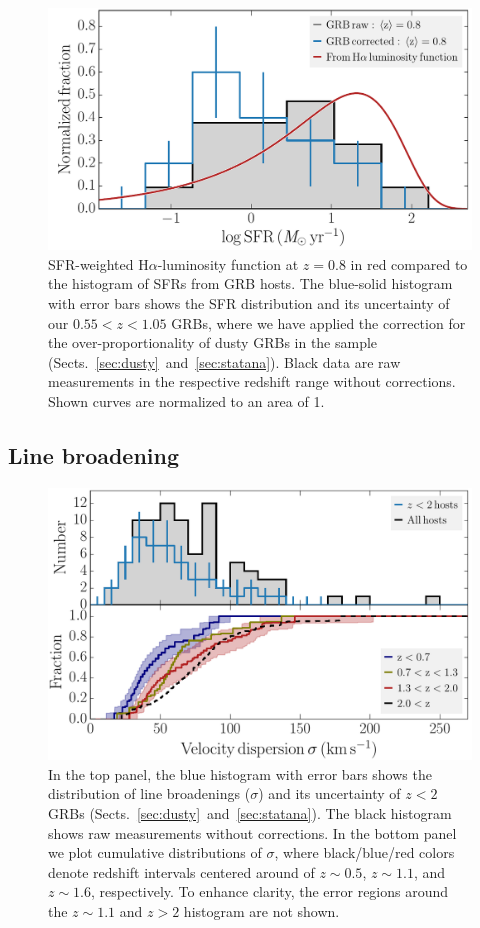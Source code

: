 \documentclass[traditabstract, longauth]{aa}
\newcommand{\ha}{H$\alpha$}
\begin{document}
\begin{figure}
\includegraphics[angle=0, width=0.99\columnwidth]{Figs/SFRvsLFHa.pdf}
\caption{ {SFR-weighted \ha-luminosity function at $z=0.8$ \citep{2011ApJ...726..109L} in red compared to the histogram of SFRs from GRB hosts. The blue-solid histogram with error bars shows the SFR distribution and its uncertainty of our $0.55 < z < 1.05$ GRBs, where we have applied the correction for the over-proportionality of dusty GRBs in the sample (Sects.~\ref{sec:dusty}~and~\ref{sec:statana}). Black data are raw measurements in the respective redshift range without corrections. Shown curves are normalized to an area of 1.}}
\label{fig:sfrhalpha}
\end{figure}

\subsection{Line broadening}
\label{sec:velo}

\begin{figure}
\includegraphics[angle=0, width=0.99\columnwidth]{Figs/Velo_histogram.pdf}
\caption{In the top panel, the blue histogram with error bars shows the distribution of line broadenings ($\sigma$) and its uncertainty of $z < 2$ GRBs (Sects.~\ref{sec:dusty}~and~\ref{sec:statana}). The black histogram shows raw measurements without corrections. In the bottom panel we plot cumulative distributions of $\sigma$, where black/blue/red colors denote redshift intervals centered around of $z\sim0.5$, $z\sim1.1$, and $z\sim1.6$, respectively. To enhance clarity, the error regions around the $z\sim1.1$ and $z>2$ histogram are not shown.}
\label{fig:velohist}
\end{figure}
\end{document}

